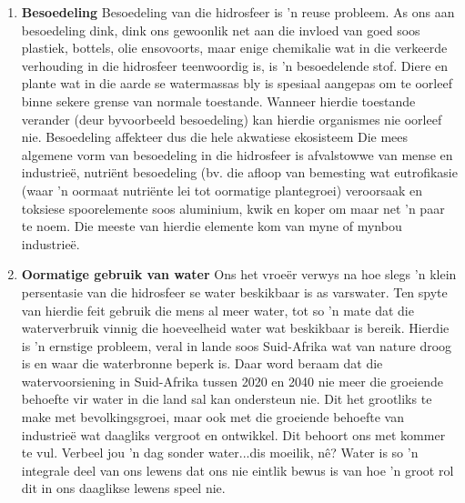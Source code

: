       \label{m38138*id342223}\begin{enumerate}[noitemsep, label=\textbf{\arabic*}. ] 
            \label{m38138*uid91}\item \textbf{Besoedeling}\newline
Besoedeling van die hidrosfeer is  'n reuse probleem. As ons aan besoedeling dink, dink ons gewoonlik net aan die invloed van goed soos plastiek, bottels, olie ensovoorts, maar enige chemikalie wat in die verkeerde verhouding in die hidrosfeer teenwoordig is, is  'n besoedelende stof. Diere en plante wat in die aarde se watermassas bly is spesiaal aangepas om te oorleef binne sekere grense van normale toestande. Wanneer hierdie toestande verander (deur byvoorbeeld besoedeling) kan hierdie organismes nie oorleef nie. Besoedeling affekteer dus die hele akwatiese ekosisteem Die mees algemene vorm van besoedeling in die hidrosfeer is afvalstowwe van mense en industrie\"{e}, nutriënt besoedeling (bv. die afloop van bemesting wat eutrofikasie (waar  'n oormaat nutriënte lei tot oormatige plantegroei) veroorsaak en toksiese spoorelemente soos aluminium, kwik en koper om maar net  'n paar te noem. Die meeste van hierdie elemente kom van myne of mynbou industrieë.
\label{m38138*uid87}\item \textbf{Oormatige gebruik van water}\newline
Ons het vroe\"{e}r verwys na hoe slegs  'n klein persentasie van die hidrosfeer se water beskikbaar is as varswater. Ten spyte van hierdie feit gebruik die mens al meer water, tot so  'n mate dat die waterverbruik vinnig die hoeveelheid water wat beskikbaar is bereik. Hierdie is  'n ernstige probleem, veral in lande soos Suid-Afrika wat van nature droog is en waar die waterbronne beperk is. Daar word beraam dat die watervoorsiening in Suid-Afrika tussen 2020 en 2040 nie meer die groeiende behoefte vir water in die land sal kan ondersteun nie. Dit het grootliks te make met bevolkingsgroei, maar ook met die groeiende behoefte van industrieë wat daagliks vergroot en ontwikkel. Dit behoort ons met kommer te vul. Verbeel jou  'n dag sonder water...dis moeilik, nê? Water is so  'n integrale deel van ons lewens dat ons nie eintlik bewus is van hoe  'n groot rol dit in ons daaglikse lewens speel nie.
\end{enumerate}
\label{m38138*secfhsst!!!underscore!!!id1046}
